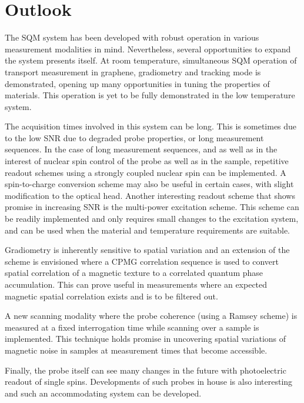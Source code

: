 \section*{Outlook}
The \gls{SQM} system has been developed with robust operation in various measurement modalities in mind. Nevertheless, several opportunities to expand the system presents itself. At room temperature, simultaneous \gls{SQM} operation of transport measurement in graphene, gradiometry and tracking mode is demonstrated, opening up many opportunities in tuning the properties of materials. This operation is yet to be fully demonstrated in the low temperature system. 

The acquisition times involved in this system can be long. This is sometimes due to the low \gls{SNR} due to degraded probe properties, or long measurement sequences. In the case of long measurement sequences, and as well as in the interest of nuclear spin control of the probe as well as in the sample, repetitive readout schemes using a strongly coupled nuclear spin can be implemented\cite{neumannSingleShotReadoutSingle2010}. A spin-to-charge conversion scheme may also be useful in certain cases\cite{shieldsEfficientReadoutSingle2015}, with slight modification to the optical head. Another interesting readout scheme that shows promise in increasing \gls{SNR} is the multi-power excitation scheme\cite{wirtitschExploitingIonizationDynamics2023b}. This scheme can be readily implemented and only requires small changes to the excitation system, and can be used when the material and temperature requirements are suitable.

Gradiometry is inherently sensitive to spatial variation and an extension of the scheme is envisioned where a \gls{CPMG} correlation sequence is used to convert spatial correlation of a magnetic texture to a correlated quantum phase accumulation. This can prove useful in measurements where an expected magnetic spatial correlation exists and is to be filtered out. 

A new scanning modality where the probe coherence (using a Ramsey scheme) is measured at a fixed interrogation time while scanning over a sample is implemented. This technique holds promise in uncovering spatial variations of magnetic noise in samples at measurement times that become accessible. 

Finally, the probe itself can see many changes in the future with photoelectric readout of single spins\cite{siyushevPhotoelectricalImagingCoherent2019a,nishikawaCoherentPhotoelectricalReadout2025}. Developments of such probes in house is also interesting and such an accommodating system can be developed.